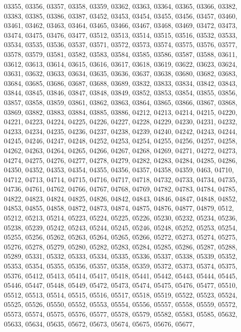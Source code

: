 {03355,
03356,
03357,
03358,
03359,
03362,
03363,
03364,
03365,
03366,
03382,
03383,
03385,
03386,
03387,
03452,
03453,
03454,
03455,
03456,
03457,
03460,
03461,
03462,
03463,
03464,
03465,
03466,
03467,
03468,
03469,
03472,
03473,
03474,
03475,
03476,
03477,
03512,
03513,
03514,
03515,
03516,
03532,
03533,
03534,
03535,
03536,
03537,
03571,
03572,
03573,
03574,
03575,
03576,
03577,
03578,
03579,
03581,
03582,
03583,
03584,
03585,
03586,
03587,
03588,
03611,
03612,
03613,
03614,
03615,
03616,
03617,
03618,
03619,
03622,
03623,
03624,
03631,
03632,
03633,
03634,
03635,
03636,
03637,
03638,
03680,
03682,
03683,
03684,
03685,
03686,
03687,
03688,
03689,
03832,
03833,
03834,
03842,
03843,
03844,
03845,
03846,
03847,
03848,
03849,
03852,
03853,
03854,
03855,
03856,
03857,
03858,
03859,
03861,
03862,
03863,
03864,
03865,
03866,
03867,
03868,
03869,
03882,
03883,
03884,
03885,
03886,
04212,
04213,
04214,
04215,
04220,
04221,
04223,
04224,
04225,
04226,
04227,
04228,
04229,
04230,
04231,
04232,
04233,
04234,
04235,
04236,
04237,
04238,
04239,
04240,
04242,
04243,
04244,
04245,
04246,
04247,
04248,
04252,
04253,
04254,
04255,
04256,
04257,
04258,
04262,
04263,
04264,
04265,
04266,
04267,
04268,
04269,
04271,
04272,
04273,
04274,
04275,
04276,
04277,
04278,
04279,
04282,
04283,
04284,
04285,
04286,
04350,
04352,
04353,
04354,
04355,
04356,
04357,
04358,
04359,
0463,
04710,
04712,
04713,
04714,
04715,
04716,
04717,
04718,
04732,
04733,
04734,
04735,
04736,
04761,
04762,
04766,
04767,
04768,
04769,
04782,
04783,
04784,
04785,
04822,
04823,
04824,
04825,
04826,
04842,
04843,
04846,
04847,
04848,
04852,
04853,
04855,
04858,
04872,
04873,
04874,
04875,
04876,
04877,
04879,
0512,
05212,
05213,
05214,
05223,
05224,
05225,
05226,
05230,
05232,
05234,
05236,
05238,
05239,
05242,
05243,
05244,
05245,
05246,
05248,
05252,
05253,
05254,
05255,
05256,
05262,
05263,
05264,
05265,
05266,
05272,
05273,
05274,
05275,
05276,
05278,
05279,
05280,
05282,
05283,
05284,
05285,
05286,
05287,
05288,
05289,
05331,
05332,
05333,
05334,
05335,
05336,
05337,
05338,
05339,
05352,
05353,
05354,
05355,
05356,
05357,
05358,
05359,
05372,
05373,
05374,
05375,
05376,
05412,
05413,
05414,
05417,
05418,
05441,
05442,
05443,
05444,
05445,
05446,
05447,
05448,
05449,
05472,
05473,
05474,
05475,
05476,
05477,
05510,
05512,
05513,
05514,
05515,
05516,
05517,
05518,
05519,
05522,
05523,
05524,
05525,
05526,
05550,
05552,
05553,
05554,
05556,
05557,
05558,
05559,
05572,
05573,
05574,
05575,
05576,
05577,
05578,
05579,
05582,
05583,
05585,
05632,
05633,
05634,
05635,
05672,
05673,
05674,
05675,
05676,
05677,
}
